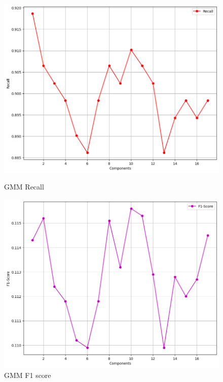 \begin{figure}[H]
    \\
    \begin{minipage}[t]{0.5\textwidth}
        \vspace{0pt}
        \includegraphics[width=\textwidth]{images/gmm-recall.png}
        \caption{GMM Recall}
    \end{minipage}
    \hfill
    \begin{minipage}[t]{0.5\textwidth}
        \vspace{0pt}
        \includegraphics[width=\textwidth]{images/gmm-f1-score.png}
        \caption{GMM F1 score}
    \end{minipage}
\end{figure}

